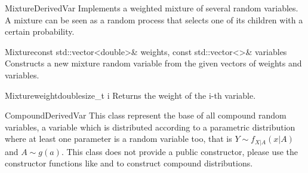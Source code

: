 \begin{defclassex}{Mixture}{DerivedVar}
Implements a weighted mixture of several random variables. A mixture can be
seen as a random process that selects one of its children with a certain probability.

\begin{classsyn}{Mixture}{const std::vector<double>\& weights, const std::vector<>\& variables}
Constructs a new mixture random variable from the given vectors of weights and variables. 
\end{classsyn}

\begin{defmeth}{Mixture}{weight}{double}{size\_t i}
Returns the weight of the i-th variable.
\end{defmeth}
\end{defclassex}


\begin{defclassex}{Compound}{DerivedVar}
This class represent the base of all compound random variables, a variable which
is distributed according to a parametric distribution where at least one parameter
is a random variable too, that is $Y\sim f_{X|A}(x|A)$ and $A\sim g(a)$. This
class does not provide a public constructor, please use the constructor functions
like  and  to construct 
compound distributions.
\end{defclassex}


